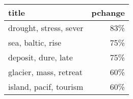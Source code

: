 \begin{tabular}{p{1.2cm}r}
\toprule
                  title &  pchange \\
\midrule
 drought, stress, sever &      83\% \\
      sea, baltic, rise &      75\% \\
    deposit, dure, late &      75\% \\
 glacier, mass, retreat &      60\% \\
 island, pacif, tourism &      60\% \\
\bottomrule
\end{tabular}
